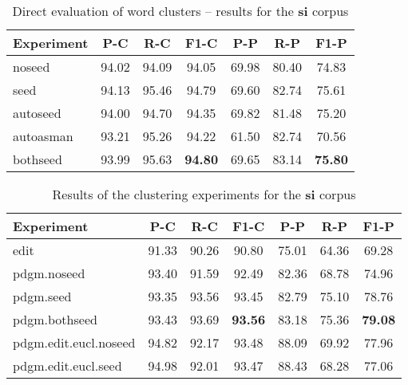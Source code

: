 \begin{table}[h]
\begin{center}
\begin{tabular}{lcccccc}
\toprule
\bf Experiment & \bf P-C & \bf R-C & \bf F1-C & \bf P-P & \bf R-P & \bf F1-P\\
\midrule
noseed & 94.02 & 94.09 & 94.05 & 69.98 & 80.40 & 74.83\\
seed & 94.13 & 95.46 & 94.79 & 69.60 & 82.74 & 75.61\\
autoseed & 94.00 & 94.70 & 94.35 & 69.82 & 81.48 & 75.20\\
autoasman & 93.21 & 95.26 & 94.22 & 61.50 & 82.74 & 70.56\\
bothseed & 93.99 & 95.63 & \bf 94.80 & 69.65 & 83.14 & \bf 75.80\\
\bottomrule
\end{tabular}
\end{center}
\caption{\label{table:res:si:direct} Direct evaluation of word clusters -- results for the \textbf{si} corpus}
\end{table}

\begin{table}[h]
\begin{center}
\begin{tabular}{lcccccc}
\toprule
\bf Experiment & \bf P-C & \bf R-C & \bf F1-C & \bf P-P & \bf R-P & \bf F1-P\\
\midrule
edit & 91.33 & 90.26 & 90.80 & 75.01 & 64.36 & 69.28\\
pdgm.noseed & 93.40 & 91.59 & 92.49 & 82.36 & 68.78 & 74.96\\
pdgm.seed & 93.35 & 93.56 & 93.45 & 82.79 & 75.10 & 78.76\\
pdgm.bothseed & 93.43 & 93.69 & \bf 93.56 & 83.18 & 75.36 & \bf 79.08\\
pdgm.edit.eucl.noseed & 94.82 & 92.17 & 93.48 & 88.09 & 69.92 & 77.96\\
pdgm.edit.eucl.seed & 94.98 & 92.01 & 93.47 & 88.43 & 68.28 & 77.06\\
\bottomrule
\end{tabular}
\end{center}
\caption{\label{table:res:si:clust} Results of the clustering experiments for the \textbf{si} corpus}
\end{table}

